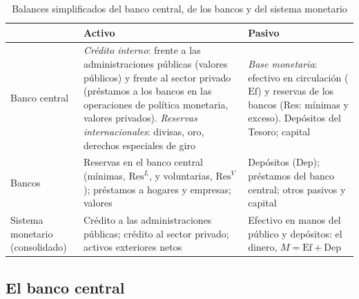 \documentclass[11pt]{article}
\begin{document}
\begin{table}[H]
\centering
\caption{Balances simplificados del banco central, de los bancos y del sistema monetario}\label{tab:balances}
\small
\begin{tabular}{>{\raggedright\arraybackslash}p{}>{\raggedright\arraybackslash}p{}>{\raggedright\arraybackslash}p{}}
\toprule
\rowcolor{tceeazulpalido} & \textbf{Activo} & \textbf{Pasivo} \\
\midrule
Banco central & \emph{Crédito interno}: frente a las administraciones públicas (valores públicos) y frente al sector privado (préstamos a los bancos en las operaciones de política monetaria, valores privados). \emph{Reservas internacionales}: divisas, oro, derechos especiales de giro & \emph{Base monetaria}: efectivo en circulación ($\mathrm{Ef}$) y reservas de los bancos ($\mathrm{Res}$: mínimas y exceso). Depósitos del Tesoro; capital \\
Bancos & Reservas en el banco central (mínimas, $\mathrm{Res}^L$, y voluntarias, $\mathrm{Res}^V$); préstamos a hogares y empresas; valores & Depósitos ($\mathrm{Dep}$); préstamos del banco central; otros pasivos y capital \\
Sistema monetario (consolidado) & Crédito a las administraciones públicas; crédito al sector privado; activos exteriores netos & Efectivo en manos del público y depósitos: el dinero, $M=\mathrm{Ef}+\mathrm{Dep}$ \\
\bottomrule
\end{tabular}
\end{table}

\subsection{El banco central}
\end{document}
